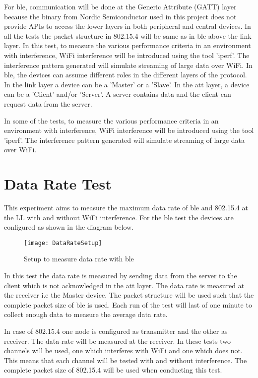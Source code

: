 For \gls{ble}, communication will be done at the Generic Attribute (GATT) layer because the binary from Nordic Semiconductor used in this project does not provide APIs to access the lower layers in both peripheral and central devices. In all the tests the packet structure in 802.15.4 will be same as in \gls{ble} above the link layer.
In this test, to measure the various performance criteria in an environment with interference, WiFi interference will be introduced using the tool 'iperf'. The interference pattern generated will simulate streaming of large data over WiFi. 
In \gls{ble}, the devices can assume different roles in the different layers of the protocol. In the link layer a device can be a 'Master' or a 'Slave'. In the \gls{att} layer, a device can be a 'Client' and/or 'Server'. A server contains data and the client can request data from the server.

In some of the tests, to measure the various performance criteria in an environment with interference, WiFi interference will be introduced using the tool 'iperf'. The interference pattern generated will simulate streaming of large data over WiFi.

\section{Data Rate Test}
This experiment aims to measure the maximum data rate of \gls{ble} and 802.15.4 at the LL with and without WiFi interference. For the \gls{ble} test the devices are configured as shown in the diagram below.

\begin{figure}[h]
    \centering
    \texttt{[image: DataRateSetup]}
	\caption{Setup to measure data rate with \gls{ble}}
\end{figure}

In this test the data rate is measured by sending data from the server to the client which is not acknowledged in the \gls{att} layer. The data rate is measured at the receiver i.e the Master device. The packet structure will be used such that the complete packet size of \gls{ble} is used. Each run of the test will last of one minute to collect enough data to measure the average data rate.

In case of 802.15.4 one node is configured as transmitter and the other as receiver. The data-rate will be measured at the receiver. In these tests two channels will be used, one which interferes with WiFi and one which does not. This means that each channel will be tested with and without interference. The complete packet size of 802.15.4 will be used when conducting this test.

